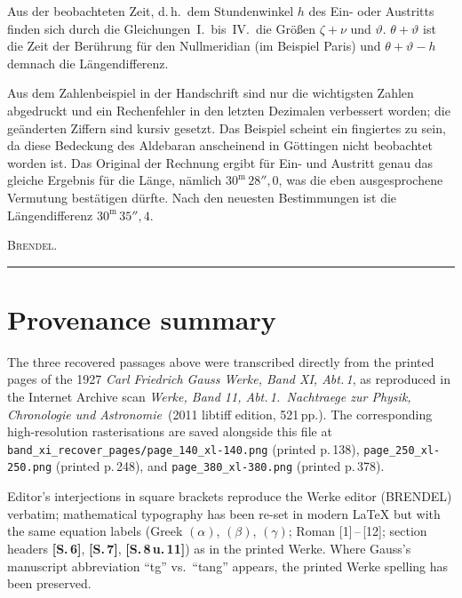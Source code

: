 \documentclass[10pt,a4paper]{article}
\begin{document}
\smallskip
Aus der beobachteten Zeit, d.\,h.\ dem Stundenwinkel $h$ des Ein- oder
Austritts finden sich durch die Gleichungen~I.\ bis~IV.\ die Gr\"o\ss en
$\zeta+\nu$ und $\vartheta$.  $\theta+\vartheta$ ist die Zeit der
Ber\"uhrung f\"ur den Nullmeridian (im Beispiel Paris) und
$\theta+\vartheta-h$ demnach die L\"angendifferenz.

\smallskip
Aus dem Zahlenbeispiel in der Handschrift sind nur die wichtigsten
Zahlen abgedruckt und ein Rechenfehler in den letzten Dezimalen
verbessert worden; die ge\"anderten Ziffern sind kursiv gesetzt. Das
Beispiel scheint ein fingiertes zu sein, da diese Bedeckung des
Aldebaran anscheinend in G\"ottingen nicht beobachtet worden ist. Das
Original der Rechnung ergibt f\"ur Ein- und Austritt genau das gleiche
Ergebnis f\"ur die L\"ange, n\"amlich $30^{\mathrm{m}}\,28''\!\!,\!0$, was
die eben ausgesprochene Vermutung best\"atigen d\"urfte. Nach den
neuesten Bestimmungen ist die L\"angendifferenz
$30^{\mathrm{m}}\,35''\!\!,\!4$.

\hfill\textsc{Brendel.}

\bigskip\hrule\bigskip

\section*{Provenance summary}

\noindent The three recovered passages above were transcribed directly
from the printed pages of the 1927 \textit{Carl Friedrich Gauss Werke,
Band XI, Abt.\,1}, as reproduced in the Internet Archive scan
\textit{Werke, Band 11, Abt.\,1.\ Nachtraege zur Physik, Chronologie und
Astronomie}~(2011 libtiff edition, 521\,pp.). The corresponding
high-resolution rasterisations are saved alongside this file at
\texttt{band\_xi\_recover\_pages/page\_140\_xl-140.png} (printed p.\,138),
\texttt{page\_250\_xl-250.png} (printed p.\,248), and
\texttt{page\_380\_xl-380.png} (printed p.\,378).

\smallskip
Editor's interjections in square brackets reproduce the Werke editor
(BRENDEL) verbatim; mathematical typography has been re-set in
modern \LaTeX{} but with the same equation labels (Greek $(\alpha)$,
$(\beta)$, $(\gamma)$; Roman [1]\,--\,[12]; section headers
\textbf{[S.\,6]}, \textbf{[S.\,7]}, \textbf{[S.\,8\,u.\,11]}) as in the
printed Werke.  Where Gauss's manuscript abbreviation ``tg'' vs.\ ``tang''
appears, the printed Werke spelling has been preserved.
\end{document}
